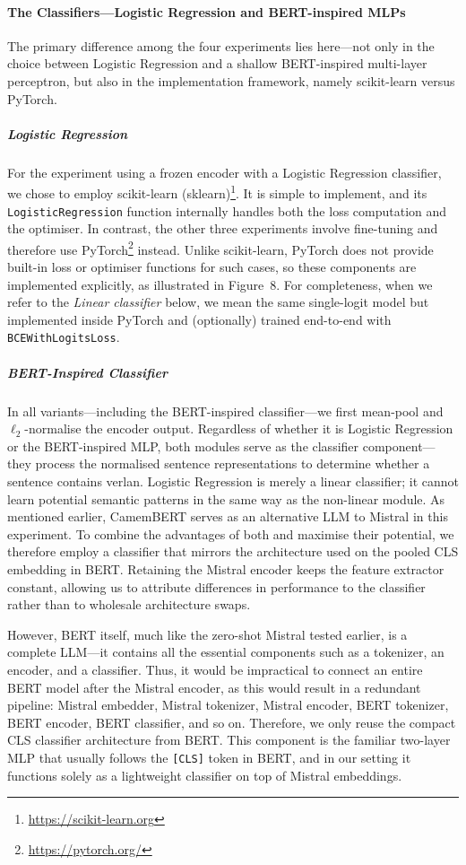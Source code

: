 \documentclass[12pt]{article}
\begin{document}
\paragraph{The Classifiers\;---\;Logistic Regression and BERT-inspired MLPs}
The primary difference among the four experiments lies here\;---\;not only in the choice between Logistic Regression and a shallow BERT-inspired multi-layer perceptron, but also in the implementation framework, namely scikit-learn versus PyTorch.

\subparagraph{Logistic Regression}
For the experiment using a frozen encoder with a Logistic Regression classifier, we chose to employ scikit-learn (sklearn)\footnote{\url{https://scikit-learn.org}}. 
It is simple to implement, and its \texttt{LogisticRegression} function internally handles both the loss computation and the optimiser. 
In contrast, the other three experiments involve fine-tuning and therefore use PyTorch\footnote{\url{https://pytorch.org/}} instead. 
Unlike scikit-learn, PyTorch does not provide built-in loss or optimiser functions for such cases, so these components are implemented explicitly, as illustrated in Figure~8. 
For completeness, when we refer to the \textit{Linear classifier} below, we mean the same single-logit model but implemented inside PyTorch and (optionally) trained end-to-end with \texttt{BCEWithLogitsLoss}.

\subparagraph{BERT-Inspired Classifier}
In all variants—including the BERT-inspired classifier—we first mean-pool and $\ell_2$-normalise the encoder output.
Regardless of whether it is Logistic Regression or the BERT-inspired MLP, both modules serve as the classifier component\;---\;they process the normalised sentence representations to determine whether a sentence contains verlan.
Logistic Regression is merely a linear classifier; it cannot learn potential semantic patterns in the same way as the non-linear module. 
As mentioned earlier, CamemBERT serves as an alternative LLM to Mistral in this experiment. 
To combine the advantages of both and maximise their potential, we therefore employ a classifier that mirrors the architecture used on the pooled CLS embedding in BERT. Retaining the Mistral encoder keeps the feature extractor constant, allowing us to attribute differences in performance to the classifier rather than to wholesale architecture swaps.

However, BERT itself, much like the zero-shot Mistral tested earlier, is a complete LLM\;---\;it contains all the essential components such as a tokenizer, an encoder, and a classifier. 
Thus, it would be impractical to connect an entire BERT model after the Mistral encoder, as this would result in a redundant pipeline: Mistral embedder, Mistral tokenizer, Mistral encoder, BERT tokenizer, BERT encoder, BERT classifier, and so on. 
Therefore, we only reuse the compact CLS classifier architecture from BERT. This component is the familiar two-layer MLP that usually follows the \texttt{[CLS]} token in BERT, and in our setting it functions solely as a lightweight classifier on top of Mistral embeddings.
\end{document}
